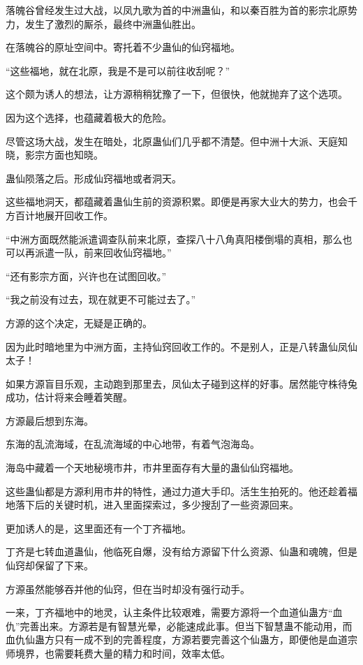 \begin{this_body}
落魄谷曾经发生过大战，以凤九歌为首的中洲蛊仙，和以秦百胜为首的影宗北原势力，发生了激烈的厮杀，最终中洲蛊仙胜出。

在落魄谷的原址空间中。寄托着不少蛊仙的仙窍福地。

“这些福地，就在北原，我是不是可以前往收刮呢？”

这个颇为诱人的想法，让方源稍稍犹豫了一下，但很快，他就抛弃了这个选项。

因为这个选择，也蕴藏着极大的危险。

尽管这场大战，发生在暗处，北原蛊仙们几乎都不清楚。但中洲十大派、天庭知晓，影宗方面也知晓。

蛊仙陨落之后。形成仙窍福地或者洞天。

这些福地洞天，都蕴藏着蛊仙生前的资源积累。即便是再家大业大的势力，也会千方百计地展开回收工作。

“中洲方面既然能派遣调查队前来北原，查探八十八角真阳楼倒塌的真相，那么也可以再派遣一队，前来回收仙窍福地。”

“还有影宗方面，兴许也在试图回收。”

“我之前没有过去，现在就更不可能过去了。”

方源的这个决定，无疑是正确的。

因为此时暗地里为中洲方面，主持仙窍回收工作的。不是别人，正是八转蛊仙凤仙太子！

如果方源盲目乐观，主动跑到那里去，凤仙太子碰到这样的好事。居然能守株待兔成功，估计将来会睡着笑醒。

方源最后想到东海。

东海的乱流海域，在乱流海域的中心地带，有着气泡海岛。

海岛中藏着一个天地秘境市井，市井里面存有大量的蛊仙仙窍福地。

这些蛊仙都是方源利用市井的特性，通过力道大手印。活生生拍死的。他还趁着福地落下后的关键时机，进入里面探索过，多少搜刮了一些资源回来。

更加诱人的是，这里面还有一个丁齐福地。

丁齐是七转血道蛊仙，他临死自爆，没有给方源留下什么资源、仙蛊和魂魄，但是仙窍却保留了下来。

方源虽然能够吞并他的仙窍，但在当时却没有强行动手。

一来，丁齐福地中的地灵，认主条件比较艰难，需要方源将一个血道仙蛊方“血仇”完善出来。方源若是有智慧光晕，必能速成此事。但当下智慧蛊不能动用，而血仇仙蛊方只有一成不到的完善程度，方源若要完善这个仙蛊方，即便他是血道宗师境界，也需要耗费大量的精力和时间，效率太低。


\end{this_body}
